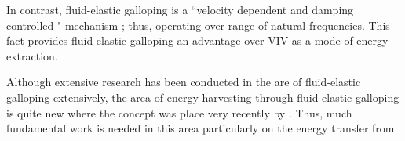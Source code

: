 In contrast, fluid-elastic galloping is a ``velocity dependent and damping controlled " mechanism \citep{Paidoussis2010}; thus, operating over range of natural frequencies. This fact provides fluid-elastic galloping an advantage over VIV as a mode of energy extraction. 

Although extensive research has been conducted in the are of fluid-elastic galloping extensively, the area of energy harvesting through fluid-elastic galloping is quite new where the concept was place very recently by \citet{Barrero-Gil2010a}. Thus, much fundamental work is needed in this area particularly on the energy transfer from   






